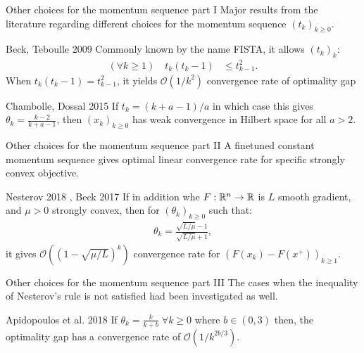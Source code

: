 \documentclass[11pt]{beamer}
\theoremstyle{definition}
\begin{document}
        \begin{frame}{Other choices for the momentum sequence part I}
            Major results from the literature regarding different choices for the momentum sequence $(t_k)_{k \ge 0}$. 
            \begin{block}{Beck, Teboulle 2009 {\cite[Theorem 4.4]{beck_fast_2009-1}}}
                Commonly known by the name FISTA, it allows $(t_k)_{k}$: 
                \begin{align*}
                    (\forall k \ge 1)\quad t_k (t_k - 1) &\le t_{k - 1}^2. 
                \end{align*}    
                When $t_k (t_k - 1) = t_{k - 1}^2$, it yields $\mathcal O(1/k^2)$ convergence rate of optimality gap
            \end{block}
            \begin{block}{Chambolle, Dossal 2015 \cite[Theorem 4.1]{chambolle_convergence_2015}}
                If $t_k = (k + a -1)/a$ in which case this gives $\theta_{k} = \frac{k - 2}{k + a - 1}$, then $(x_k)_{k \ge 0}$ has weak convergence in Hilbert space for all $a > 2$.    
            \end{block}
        \end{frame}
        \begin{frame}{Other choices for the momentum sequence part II}
            A finetuned constant momentum sequence gives optimal linear convergence rate for specific strongly convex objective. 
            \begin{block}{
                Nesterov 2018 {\cite[Theorem 2.2.3]{nesterov_lectures_2018}}, 
                Beck 2017 {\cite[Theorem 10.42]{beck_first-order_2017}}
            }
                If in addition whe $F:\mathbb R^n \rightarrow \mathbb R$ is $L$ smooth gradient, and $\mu > 0$ strongly convex, then for $(\theta_k)_{k\ge 0}$ such that: 
                \begin{align*}
                    \theta_k = \frac{\sqrt{L/\mu} - 1}{\sqrt{L/\mu} + 1}, 
                \end{align*}
                it gives $\mathcal O\left(\left(1 - \sqrt{\mu/L}\right)^k\right)$ convergence rate for $(F(x_k) - F(x^+))_{k \ge 1}$. 
            \end{block}
        \end{frame}
        \begin{frame}{Other choices for the momentum sequence part III}
            The cases when the inequality of Nesterov's rule is not satisfied had been investigated as well.
            \begin{block}{Apidopoulos et al. 2018 \cite{apidopoulos_convergence_2018}}
                If $\theta_k = \frac{k}{k + b}\;\forall k \ge 0$ where $b \in (0, 3)$ then, the optimality gap has a convergence rate of $\mathcal O(1/k^{2b/3})$. 
            \end{block}
        \end{frame}
    
\end{document}
